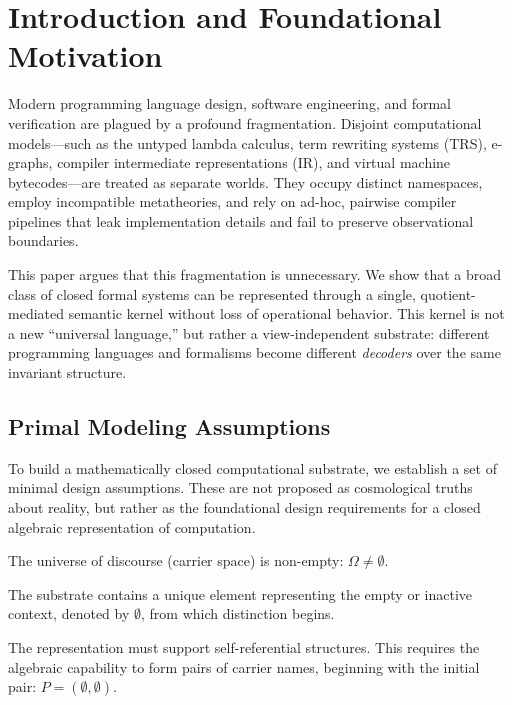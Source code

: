 \chapter{Introduction and Foundational Motivation}

Modern programming language design, software engineering, and formal verification are plagued by a profound fragmentation. Disjoint computational models—such as the untyped lambda calculus, term rewriting systems (TRS), e-graphs, compiler intermediate representations (IR), and virtual machine bytecodes—are treated as separate worlds. They occupy distinct namespaces, employ incompatible metatheories, and rely on ad-hoc, pairwise compiler pipelines that leak implementation details and fail to preserve observational boundaries.

This paper argues that this fragmentation is unnecessary. We show that a broad class of closed formal systems can be represented through a single, quotient-mediated semantic kernel without loss of operational behavior. This kernel is not a new ``universal language,'' but rather a view-independent substrate: different programming languages and formalisms become different \textit{decoders} over the same invariant structure.

\section{Primal Modeling Assumptions}

To build a mathematically closed computational substrate, we establish a set of minimal design assumptions. These are not proposed as cosmological truths about reality, but rather as the foundational design requirements for a closed algebraic representation of computation.

\begin{axiom}
The universe of discourse (carrier space) is non-empty: $\Omega \neq \emptyset$.
\end{axiom}

\begin{axiom}
The substrate contains a unique element representing the empty or inactive context, denoted by $\emptyset$, from which distinction begins.
\end{axiom}

\begin{axiom}
The representation must support self-referential structures. This requires the algebraic capability to form pairs of carrier names, beginning with the initial pair: $P = (\emptyset, \emptyset)$.
\end{axiom}

